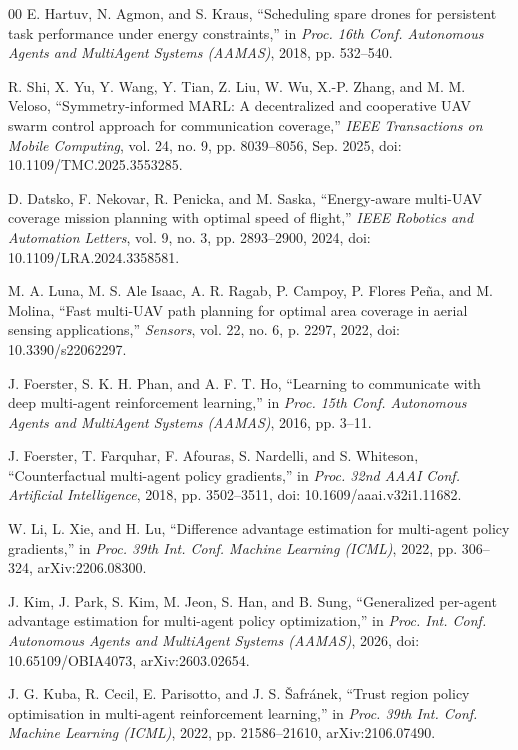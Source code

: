 \documentclass[conference]{IEEEtran}
\begin{document}
\begin{thebibliography}{00}
E. Hartuv, N. Agmon, and S. Kraus, ``Scheduling spare drones for persistent task performance under energy constraints,'' in \emph{Proc. 16th Conf. Autonomous Agents and MultiAgent Systems (AAMAS)}, 2018, pp. 532--540.

R. Shi, X. Yu, Y. Wang, Y. Tian, Z. Liu, W. Wu, X.-P. Zhang, and M. M. Veloso, ``Symmetry-informed MARL: A decentralized and cooperative UAV swarm control approach for communication coverage,'' \emph{IEEE Transactions on Mobile Computing}, vol. 24, no. 9, pp. 8039--8056, Sep. 2025, doi: 10.1109/TMC.2025.3553285.

D. Datsko, F. Nekovar, R. Penicka, and M. Saska, ``Energy-aware multi-UAV coverage mission planning with optimal speed of flight,'' \emph{IEEE Robotics and Automation Letters}, vol. 9, no. 3, pp. 2893--2900, 2024, doi: 10.1109/LRA.2024.3358581.

M. A. Luna, M. S. Ale Isaac, A. R. Ragab, P. Campoy, P. Flores Pe\~na, and M. Molina, ``Fast multi-UAV path planning for optimal area coverage in aerial sensing applications,'' \emph{Sensors}, vol. 22, no. 6, p. 2297, 2022, doi: 10.3390/s22062297.

J. Foerster, S. K. H. Phan, and A. F. T. Ho, ``Learning to communicate with deep multi-agent reinforcement learning,'' in \emph{Proc. 15th Conf. Autonomous Agents and MultiAgent Systems (AAMAS)}, 2016, pp. 3--11.

J. Foerster, T. Farquhar, F. Afouras, S. Nardelli, and S. Whiteson, ``Counterfactual multi-agent policy gradients,'' in \emph{Proc. 32nd AAAI Conf. Artificial Intelligence}, 2018, pp. 3502--3511, doi: 10.1609/aaai.v32i1.11682.

W. Li, L. Xie, and H. Lu, ``Difference advantage estimation for multi-agent policy gradients,'' in \emph{Proc. 39th Int. Conf. Machine Learning (ICML)}, 2022, pp. 306--324, arXiv:2206.08300.

J. Kim, J. Park, S. Kim, M. Jeon, S. Han, and B. Sung, ``Generalized per-agent advantage estimation for multi-agent policy optimization,'' in \emph{Proc. Int. Conf. Autonomous Agents and MultiAgent Systems (AAMAS)}, 2026, doi: 10.65109/OBIA4073, arXiv:2603.02654.

J. G. Kuba, R. Cecil, E. Parisotto, and J. S. \v{S}afr\'anek, ``Trust region policy optimisation in multi-agent reinforcement learning,'' in \emph{Proc. 39th Int. Conf. Machine Learning (ICML)}, 2022, pp. 21586--21610, arXiv:2106.07490.


\end{thebibliography}
\end{document}
